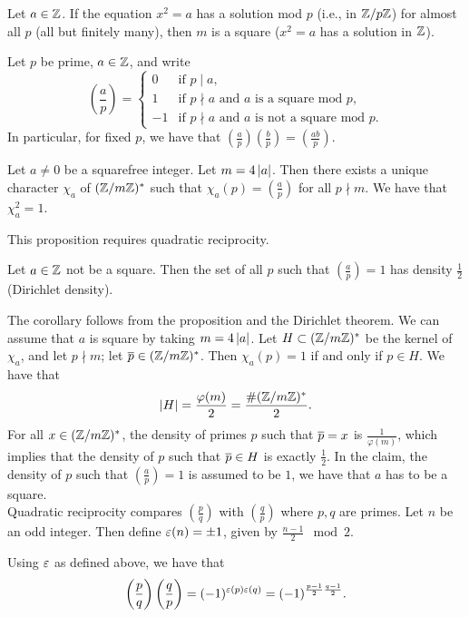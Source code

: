 \begin{claim}
    Let $a \in \mathbb Z$. If the equation $x^2 = a$ has a solution mod $p$ (i.e., in $\mathbb Z/p\mathbb Z$) for almost all $p$ (all but finitely many), then $m$ is a square ($x^2 = a$ has a solution in $\mathbb Z$).
\end{claim}
\begin{definition}
    Let $p$ be prime, $a \in \mathbb Z$, and write
    \[ \left(\frac{a}{p}\right) = \begin{cases} 0 & \text{if } p \mid a, \\ 1 & \text{if } p \nmid a \text{ and } a \text{ is a square mod } p, \\ -1 & \text{if } p \nmid a \text{ and } a \text{ is not a square mod } p. \end{cases} \]
    In particular, for fixed $p$, we have that $\left(\frac{a}{p}\right)\left(\frac{b}{p}\right) = \left(\frac{ab}{p}\right)$.
\end{definition}
\begin{proposition}
    Let $a \neq 0$ be a squarefree integer. Let $m = 4 \left\lvert a \right\rvert$. Then there exists a unique  character $\chi_a$ of $(\mathbb Z/m\mathbb Z)^\ast$ such that $\chi_a(p) = (\frac{a}{p})$ for all $p \nmid m$. We have that $\chi_a^2 = 1$.
\end{proposition}
\noindent This proposition requires quadratic reciprocity.
\begin{corollary}
    Let $a \in \mathbb Z$ not be a square. Then the set of all $p$ such that $(\frac{a}{p}) = 1$ has density $\frac{1}{2}$ (Dirichlet density).
\end{corollary}
\noindent The corollary follows from the proposition and the Dirichlet theorem. We can assume that $a$ is square by taking $m = 4 \left\lvert a \right\rvert$. Let $H \subset (\mathbb Z/m\mathbb Z)^\ast$ be the kernel of $\chi_a$, and let $p \nmid m$; let $\overline p \in (\mathbb Z/m\mathbb Z)^\ast$. Then $\chi_a(p) = 1$ if and only if $p \in H$. We have that
\[ \left\lvert H \right\rvert = \frac{\varphi(m)}{2} = \frac{\#(\mathbb Z/m\mathbb Z)^\ast}{2}. \]
For all $x \in (\mathbb Z/m\mathbb Z)^\ast$, the density of primes $p$ such that $\overline p = x$ is $\frac{1}{\varphi(m)}$, which implies that the density of $p$ such that $\overline p \in H$ is exactly $\frac{1}{2}$. In the claim, the density of $p$ such that $(\frac{a}{p}) = 1$ is assumed to be $1$, we have that $a$ has to be a square.
\\[8pt]
Quadratic reciprocity compares $(\frac{p}{q})$ with $(\frac{q}{p})$ where $p, q$ are primes. Let $n$ be an odd integer. Then define $\varepsilon(n) = \pm 1$, given by $\frac{n-1}{2} \mod 2$.
\begin{theorem}
    Using $\varepsilon$ as defined above, we have that
    \[ \left(\frac{p}{q}\right)\left(\frac{q}{p}\right) = (-1)^{\varepsilon(p) \varepsilon(q)} = (-1)^{\frac{p-1}{2} \frac{q-1}{2}}. \]
\end{theorem}

